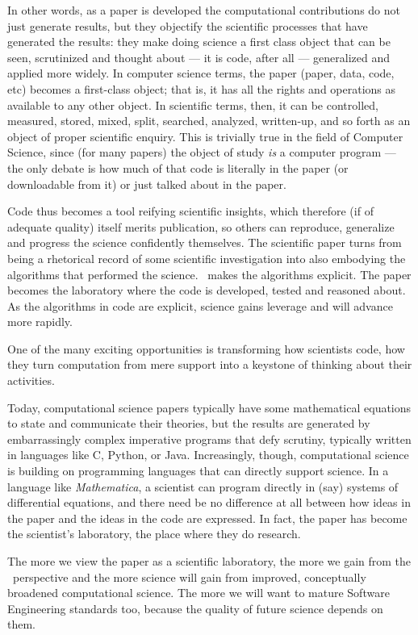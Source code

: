 \documentclass{comjnl}
\begin{document}
\begin{change}
In other words, as a paper is developed the computational contributions do not just generate results, but they objectify the scientific processes that have generated the results: they make doing science a first class object that can be seen, scrutinized and thought about --- it is code, after all --- generalized and applied more widely. In computer science terms, the paper (paper, data, code, etc) becomes a first-class object; that is, it has all the rights and operations as available to any other object. In scientific terms, then, it can be controlled, measured, stored, mixed, split, searched, analyzed, written-up, and so forth as an object of proper scientific enquiry. This is trivially true in the field of Computer Science, since (for many papers) the object of study \emph{is\/} a computer program --- the only debate is how much of that code is literally in the paper (or downloadable from it) or just talked about in the paper.

Code thus becomes a tool reifying scientific insights, which therefore (if of adequate quality) itself merits publication, so others can reproduce, generalize and progress the science confidently themselves. The scientific paper turns from being a rhetorical record of some scientific investigation into also embodying the algorithms that performed the science. \RAPstar\ makes the algorithms explicit. The paper becomes the laboratory where the code is developed, tested and reasoned about. As the algorithms in code are explicit, science gains leverage and will advance more rapidly.

One of the many exciting opportunities is transforming how scientists code, how they turn computation from mere support into a keystone of thinking about their activities. 

Today, computational science papers typically have some mathematical equations to state and communicate their theories, but the results are generated by embarrassingly complex imperative programs that defy scrutiny, typically written in languages like C, Python, or Java. Increasingly, though, computational science is building on programming languages that can directly support science. In a language like \emph{Mathematica}, a scientist can program directly in (say) systems of differential equations, and there need be no difference at all between how ideas in the paper and the ideas in the code are expressed. In fact, the paper has become the scientist's laboratory, the place where they do research.

The more we view the paper as a scientific laboratory, the more we gain from the \RAPstar\ perspective and the more science will gain from improved, conceptually broadened computational science. The more we will want to mature Software Engineering standards too, because the quality of future science depends on them.


\end{change}
\end{document}
